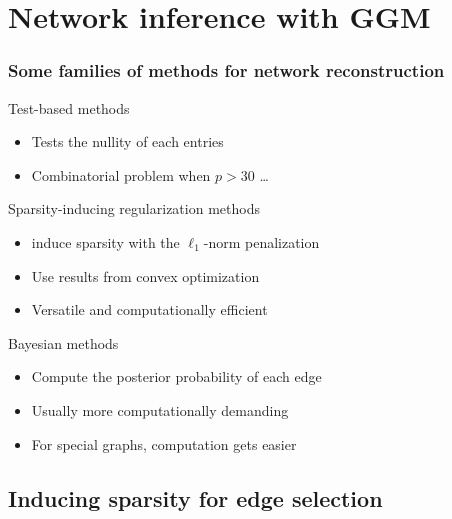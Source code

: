 \section{Network inference with GGM}

\begin{frame}
  \frametitle{Some families of methods for network reconstruction}

  \begin{block}{Test-based methods}
    \begin{itemize}
    \item Tests the nullity of each entries 
    \item Combinatorial problem when $p>30$ \dots
    \end{itemize}    
  \end{block}
  
  \vfill

  \begin{block}{\alert{Sparsity-inducing regularization methods}}
    \begin{itemize}
    \item induce sparsity with the $\ell_1$-norm penalization
    \item Use results from convex optimization
    \item Versatile and computationally efficient
    \end{itemize}
  \end{block}

  \vfill

  \begin{block}{Bayesian methods}
    \begin{itemize}
    \item Compute the posterior probability of each edge
    \item Usually more computationally demanding
    \item For special graphs, computation gets easier
    \end{itemize}
  \end{block}
  
\end{frame}

\subsection{Inducing sparsity for edge selection}

